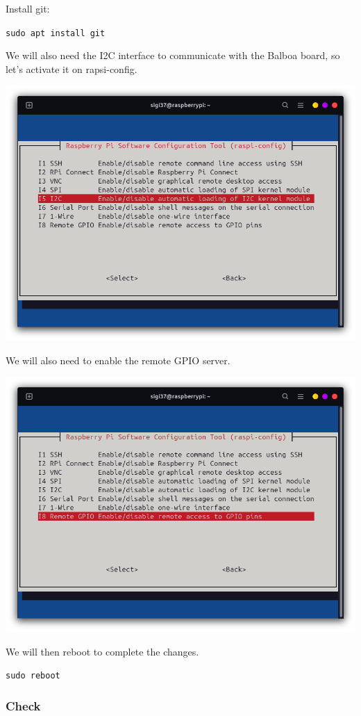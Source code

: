 \documentclass{article}
\begin{document}
Install git:

\texttt{sudo apt install git}


We will also need the I2C interface to communicate with the Balboa board, so let's activate it
on rapsi-config.

\includegraphics[scale=0.37]{img/rapsi_config_i2c.png}

We will also need to enable the remote GPIO server.

\includegraphics[scale=0.37]{img/raspi_config_rgpio.png}

We will then reboot to complete the changes.

\texttt{sudo reboot}

\subsubsection{Check}
\end{document}

